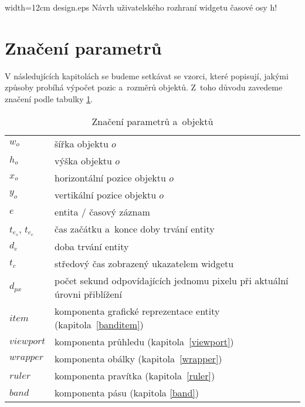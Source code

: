 			{width=12cm}
			{design.eps}
			{Návrh uživatelského rozhraní widgetu časové osy}
			{h!}
		
	\section{Značení parametrů}
	V následujících kapitolách se budeme setkávat se vzorci, které popisují, jakými způsoby probíhá výpočet pozic a~rozměrů objektů. Z~toho důvodu zavedeme zna\-čení podle tabulky \ref{znaceni}.
	\begin{table}[b!]
	\centering
		\begin{tabular}{|p{}|p{}|}
		\hline
			$w_{o}$ & šířka objektu $o$ \\
			$h_{o}$ & výška objektu $o$ \\
			$x_{o}$ & horizontální pozice objektu $o$\\
			$y_{o}$ & vertikální pozice objektu $o$\\
			$e$ & entita / časový záznam \\
			$t_{e_s}$, $t_{e_e}$ & čas začátku a~konce doby trvání entity \\
			$d_{e}$ & doba trvání entity\\
			$t_c$ & středový čas zobrazený ukazatelem widgetu \\
			$d_{px}$ & počet sekund odpovídajících jednomu pixelu při aktuální úrovni přiblížení\\
			$item$ & komponenta grafické reprezentace entity (kapitola~\ref{banditem})\\
			$viewport$ & komponenta průhledu (kapitola~\ref{viewport}) \\
			$wrapper$ & komponenta obálky  (kapitola~\ref{wrapper})\\
			$ruler$ & komponenta pravítka  (kapitola~\ref{ruler})\\
			$band$ & komponenta pásu (kapitola \ref{band})\\
			
			\hline
		\end{tabular}
		\caption{Značení parametrů a~objektů}
		\label{znaceni}
	\end{table}
	
